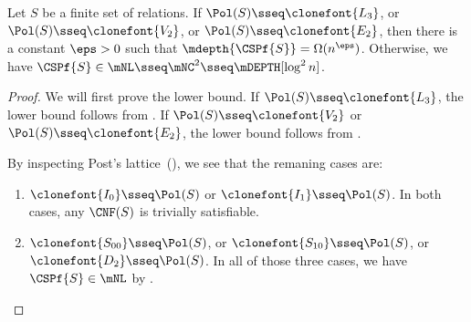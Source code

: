 \documentclass[11pt]{article}
\begin{document}
\begin{theorem}
    \label{thm:monfml-dichotomy}
    Let $S$ be a finite set of relations.
    If 
    $\Pol(S) \sseq \clonefont{L_3}$, or
    $\Pol(S) \sseq \clonefont{V_2}$, or
    $\Pol(S) \sseq \clonefont{E_2}$,
    then there 
    is
    a constant $\eps > 0$
    such that
    $\mdepth{\CSPf{S}} = {\Omega(n^\eps)}$.
    Otherwise, 
    we have
    $\CSPf{S} \in \mNL
    \sseq \mNC^2 \sseq \mDEPTH[\log^2 n]$.
\end{theorem}
\begin{proof}
    We will first prove the lower bound.
    If $\Pol(S) \sseq \clonefont{L_3}$, the lower bound follows
    from .
    If
    $\Pol(S) \sseq \clonefont{V_2}$ or
    $\Pol(S) \sseq \clonefont{E_2}$,
    the lower bound follows 
    from .
    
    By inspecting Post's 
    lattice~(),
    we see that
    the remaning cases are:
    \begin{enumerate}
        \item $\clonefont{I_0} \sseq \Pol(S)$ or $\clonefont{I_1} \sseq \Pol(S)$.
            In both cases, any $\CNF(S)$ is trivially satisfiable.
        \item 
            $\clonefont{S_{00}} \sseq \Pol(S)$,
            or
            $\clonefont{S_{10}} \sseq \Pol(S)$,
            or
            $\clonefont{D_2} \sseq \Pol(S)$.
            In all of those three cases, we have
            $\CSPf{S} \in \mNL$ by
            .
            \qedhere
    \end{enumerate}
\end{proof}
\end{document}
